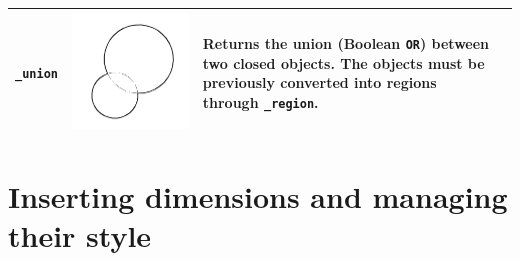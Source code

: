 \documentclass[..]{../IEEEphot}
\begin{document}
\begin{center}
\begin{longtable}{m{.2\linewidth}m{.2\linewidth}m{.25\linewidth}m{.25\linewidth}}
\texttt{\_union} & \includegraphics[width = 0.8\linewidth, keepaspectratio]{../images/jpg/_union.jpg} & Returns the union (Boolean \texttt{OR}) between two closed objects. The objects must be previously converted into regions through \texttt{\_region}. & 
\\
\bottomrule
\end{longtable}
\end{center}

\clearpage

\section{Inserting dimensions and managing their style}
\end{document}
